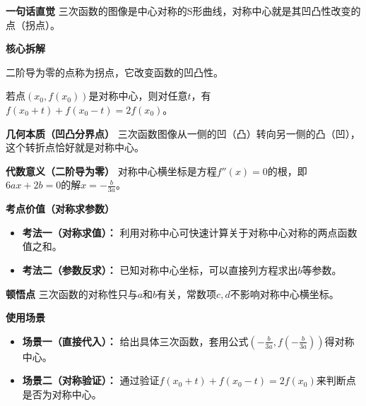 \begin{explanationbox}
	\textbf{\textcolor{CExplanation}{一句话直觉}}
	三次函数的图像是中心对称的S形曲线，对称中心就是其凹凸性改变的点（拐点）。

	\medskip
	\textbf{\textcolor{CExplanation}{核心拆解}}
	\begin{description}[style=nextline, leftmargin=2.8em, labelsep=0.5em, itemsep=0.45em]
		\item[\textbf{要点一（拐点定义）：}]
			二阶导为零的点称为拐点，它改变函数的凹凸性。
		\item[\textbf{要点二（对称条件）：}]
			若点$(x_0,f(x_0))$是对称中心，则对任意$t$，有$f(x_0+t)+f(x_0-t)=2f(x_0)$。
	\end{description}

	\medskip
	\textbf{\textcolor{CExplanation}{几何本质（凹凸分界点）}}
	三次函数图像从一侧的凹（凸）转向另一侧的凸（凹），这个转折点恰好就是对称中心。

	\medskip
	\textbf{\textcolor{CExplanation}{代数意义（二阶导为零）}}
	对称中心横坐标是方程$f''(x)=0$的根，即$6ax+2b=0$的解$\displaystyle x=-\frac{b}{3a}$。

	\medskip
	\textbf{\textcolor{CExplanation}{考点价值（对称求参数）}}
	\begin{itemize}[leftmargin=*, itemsep=0.5em, topsep=0.4em]
		\item \textbf{考法一（对称求值）：} 利用对称中心可快速计算关于对称中心对称的两点函数值之和。
		\item \textbf{考法二（参数反求）：} 已知对称中心坐标，可以直接列方程求出$b$等参数。
	\end{itemize}

	\medskip
	\textbf{\textcolor{CExplanation}{顿悟点}}
	三次函数的对称性只与$a$和$b$有关，常数项$c,d$不影响对称中心横坐标。

	\medskip
	\textbf{\textcolor{CExplanation}{使用场景}}
	\begin{itemize}[leftmargin=*, itemsep=0.5em, topsep=0.4em]
		\item \textbf{场景一（直接代入）：} 给出具体三次函数，套用公式$(-\frac{b}{3a}, f(-\frac{b}{3a}))$得对称中心。
		\item \textbf{场景二（对称验证）：} 通过验证$f(x_0+t)+f(x_0-t)=2f(x_0)$来判断点是否为对称中心。
	\end{itemize}

\end{explanationbox}
